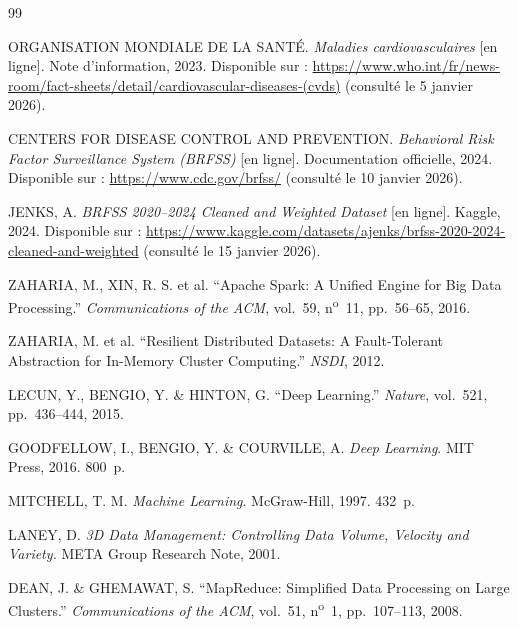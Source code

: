 \documentclass[12pt,a4paper]{report}
\begin{document}

\begin{thebibliography}{99}

ORGANISATION MONDIALE DE LA SANTÉ.
\textit{Maladies cardiovasculaires} [en ligne].
Note d'information, 2023.
Disponible sur : \url{https://www.who.int/fr/news-room/fact-sheets/detail/cardiovascular-diseases-(cvds)}
(consulté le 5 janvier 2026).

CENTERS FOR DISEASE CONTROL AND PREVENTION.
\textit{Behavioral Risk Factor Surveillance System (BRFSS)} [en ligne].
Documentation officielle, 2024.
Disponible sur : \url{https://www.cdc.gov/brfss/}
(consulté le 10 janvier 2026).

JENKS, A.
\textit{BRFSS 2020--2024 Cleaned and Weighted Dataset} [en ligne].
Kaggle, 2024.
Disponible sur : \url{https://www.kaggle.com/datasets/ajenks/brfss-2020-2024-cleaned-and-weighted}
(consulté le 15 janvier 2026).

ZAHARIA, M., XIN, R. S. et al.
``Apache Spark: A Unified Engine for Big Data Processing.''
\textit{Communications of the ACM}, vol.~59, n\textsuperscript{o}~11, pp.~56--65, 2016.

ZAHARIA, M. et al.
``Resilient Distributed Datasets: A Fault-Tolerant Abstraction for In-Memory
Cluster Computing.''
\textit{NSDI}, 2012.

LECUN, Y., BENGIO, Y. \& HINTON, G.
``Deep Learning.''
\textit{Nature}, vol.~521, pp.~436--444, 2015.

GOODFELLOW, I., BENGIO, Y. \& COURVILLE, A.
\textit{Deep Learning}.
MIT Press, 2016. 800~p.

MITCHELL, T. M.
\textit{Machine Learning}.
McGraw-Hill, 1997. 432~p.

LANEY, D.
\textit{3D Data Management: Controlling Data Volume, Velocity and Variety.}
META Group Research Note, 2001.

DEAN, J. \& GHEMAWAT, S.
``MapReduce: Simplified Data Processing on Large Clusters.''
\textit{Communications of the ACM}, vol.~51, n\textsuperscript{o}~1, pp.~107--113, 2008.


\end{thebibliography}
\end{document}
